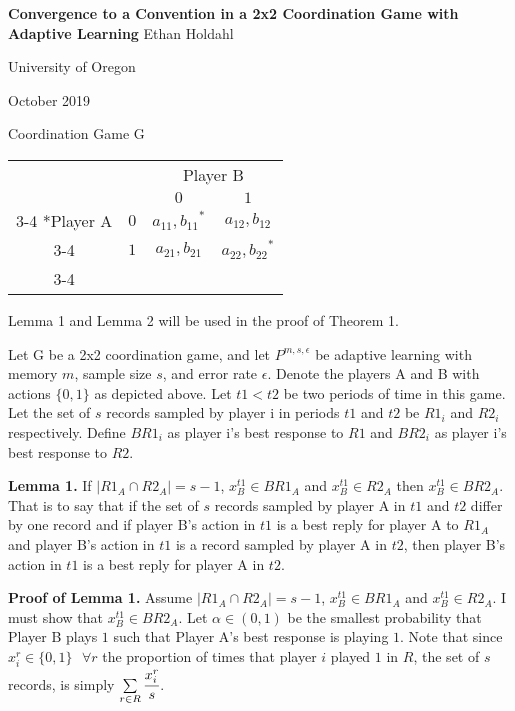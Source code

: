 \documentclass{article}
\begin{document}
\centering
\Large
\textbf{Convergence to a Convention in a 2x2 Coordination Game with Adaptive Learning}
\vskip0pt
Ethan Holdahl

\large
University of Oregon

October 2019

\vskip24pt

\centering
Coordination Game G
\vskip6pt
    \begin{tabular}{cc|c|c|}
      & \multicolumn{1}{c}{} & \multicolumn{2}{c}{Player B}\\
      & \multicolumn{1}{c}{} & \multicolumn{1}{c}{$0$}  & \multicolumn{1}{c}{$1$} \\\cline{3-4}
      \multirow{2}*{Player A}  & $0$ & ${a_{11},b_{11}}^*$ & $a_{12},b_{12}$ \\\cline{3-4}
      & $1$ & $a_{21},b_{21}$ & ${a_{22},b_{22}}^*$ \\\cline{3-4}
    \end{tabular}

\vskip24pt

\raggedright

Lemma 1 and Lemma 2 will be used in the proof of Theorem 1.

\vskip12pt

Let G be a 2x2 coordination game, and let $P^{m,s,\epsilon}$ be adaptive learning with memory $m$, sample size $s$, and error rate $\epsilon$. Denote the players A and B with actions $\{0,1\}$ as depicted above. Let $t1<t2$ be two periods of time in this game. Let the set of $s$ records sampled by player i in periods $t1$ and $t2$ be $R1_i$ and $R2_i$ respectively. Define $BR1_i$ as player i's best response to $R1$ and $BR2_i$ as player i's best response to $R2$.

\vskip12pt

\textbf{Lemma 1.} If $|R1_A \cap R2_A|=s-1$, $x_B^{t1} \in BR1_A$ and $x_B^{t1} \in R2_A$ then $x_B^{t1} \in BR2_A$. That is to say that if the set of $s$ records sampled by player A in $t1$ and $t2$ differ by one record and if player B's action in $t1$ is a best reply for player A to $R1_A$ and player B's action in $t1$ is a record sampled by player A in $t2$, then player B's action in $t1$ is a best reply for player A in $t2$.

\vskip12pt

\textbf{Proof of Lemma 1.} Assume $|R1_A \cap R2_A|=s-1$, $x_B^{t1} \in BR1_A$ and $x_B^{t1} \in R2_A$. I must show that $x_B^{t1} \in BR2_A$.
Let $\alpha \in (0,1)$ be the smallest probability that Player B plays $1$ such that Player A's best response is playing $1$.
Note that since $x_i^r \in \{0,1\} \hspace{8pt} \forall r$ the proportion of times that player $i$ played $1$ in $R$, the set of $s$ records, is simply $\sum\limits_{r \in R} \cfrac{x_i^r}{s}$.
\end{document}
